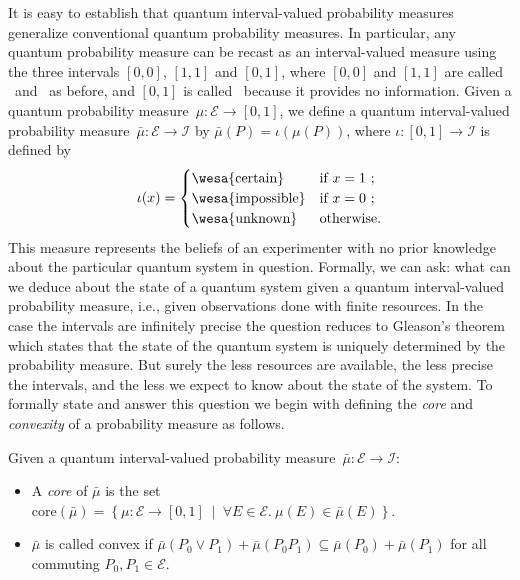 \documentclass{article}
\theoremstyle{remark}
\newcommand{\events}{\ensuremath{\mathcal{E}}}
\newcommand{\pmeas}{\ensuremath{\mu}}
\newcommand{\imposs}{{\mbox{\wesa{impossible}}}}
\newcommand{\necess}{{\mbox{\wesa{certain}}}}
\newcommand{\unknown}{{\mbox{\wesa{unknown}}}}
\begin{document}
\noindent It is easy to establish that quantum interval-valued probability
measures generalize conventional quantum probability measures. In
particular, any quantum probability measure can be recast as an interval-valued
measure using the three intervals $\left[0,0\right]$, $\left[1,1\right]$
and \emph{$\left[0,1\right]$}, where $\left[0,0\right]$ and $\left[1,1\right]$
are called \imposs~and \necess~as before, and \emph{$\left[0,1\right]$}
is called \unknown~because it provides no information. Given a quantum
probability measure~$\mu:\events\rightarrow\left[0,1\right]$, we
define a quantum interval-valued probability measure~$\bar{\mu}:\events\rightarrow\mathscr{I}$
by $\bar{\mu}(P)=\iota\left(\mu(P)\right)$, where $\iota:\left[0,1\right]\rightarrow\mathscr{I}$
is defined by 
\[
\iota(x)=\begin{cases}
\necess & \textrm{if }x=1\textrm{ ;}\\
\imposs & \textrm{if }x=0\textrm{ ;}\\
\unknown & \textrm{otherwise.}
\end{cases}
\]
This measure represents the beliefs of an experimenter with no prior
knowledge about the particular quantum system in question. Formally,
we can ask: what can we deduce about the state of a quantum system
given a quantum interval-valued probability measure, i.e., given observations
done with finite resources. In the case the intervals are infinitely
precise the question reduces to Gleason's theorem which states that
the state of the quantum system is uniquely determined by the probability
measure. But surely the less resources are available, the less precise
the intervals, and the less we expect to know about the state of the
system. To formally state and answer this question we begin with defining
the \emph{core} and \emph{convexity} of a probability measure as follows.

\begin{definition} Given a quantum interval-valued probability measure~$\bar{\mu}:\events\rightarrow\mathscr{I}$: 
\begin{itemize}
\item A \emph{core} of $\bar{\mu}$ is the set $\mathrm{core}\left(\bar{\mu}\right)=\left\{ \pmeas:\events\rightarrow[0,1]~\middle|~\forall E\in\events.~\pmeas\left(E\right)\in\bar{\mu}\left(E\right)\right\} $. 
\item $\bar{\mu}$ is called convex if $\bar{\mu}\left(P_{0}\vee P_{1}\right)+\bar{\mu}\left(P_{0}P_{1}\right)\subseteq\bar{\mu}\left(P_{0}\right)+\bar{\mu}\left(P_{1}\right)$
for all commuting $P_{0},P_{1}\in\events$. 
\end{itemize}
\end{definition}
\end{document}
